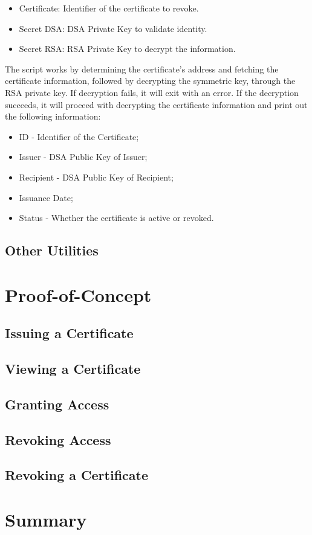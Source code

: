\begin{itemize}
    \item Certificate: Identifier of the certificate to revoke.
    \item Secret DSA: DSA Private Key to validate identity.
    \item Secret RSA: RSA Private Key to decrypt the information.
\end{itemize}

The script works by determining the certificate's address and fetching the certificate information, followed by decrypting the symmetric key, through the RSA private key. If decryption fails, it will exit with an error. If the decryption succeeds, it will proceed with decrypting the certificate information and print out the following information:

\begin{itemize}
    \item ID - Identifier of the Certificate;
    \item Issuer - DSA Public Key of Issuer;
    \item Recipient - DSA Public Key of Recipient;
    \item Issuance Date;
    \item Status - Whether the certificate is active or revoked.
\end{itemize}

\subsection{Other Utilities}

\section{Proof-of-Concept}
\label{sec:implementation-poc}

\subsection{Issuing a Certificate}

\subsection{Viewing a Certificate}

\subsection{Granting Access}

\subsection{Revoking Access}

\subsection{Revoking a Certificate}

\section{Summary}


